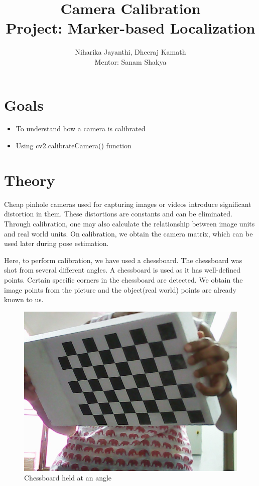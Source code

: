 \documentclass[]{article}
\date{}
\providecommand{\tightlist}{%
  \setlength{\itemsep}{0pt}\setlength{\parskip}{0pt}}
\begin{document}
	\title{\huge\textbf{Camera Calibration}\LARGE \\Project: Marker-based Localization}
	\author{Niharika Jayanthi, Dheeraj Kamath \\Mentor: Sanam Shakya}
	\maketitle
	\pagebreak
\section{Goals}\label{goals}

\begin{itemize}
\tightlist
\item
  To understand how a camera is calibrated
\item
  Using cv2.calibrateCamera() function
\end{itemize}

\section{Theory}\label{theory}

Cheap pinhole cameras used for capturing images or videos introduce
significant distortion in them. These distortions are constants and can
be eliminated. Through calibration, one may also calculate the
relationship between image units and real world units. On calibration,
we obtain the camera matrix, which can be used later during pose
estimation.

Here, to perform calibration, we have used a chessboard. The chessboard
was shot from several different angles. A chessboard is used as it has
well-defined points. Certain specific corners in the chessboard are
detected. We obtain the image points from the picture and the
object(real world) points are already known to us.

\begin{figure}[htbp]
\centering
\includegraphics{images/Camera Calibration/Chessboard.jpg}
\caption{Chessboard held at an angle}
\end{figure}
\end{document}
